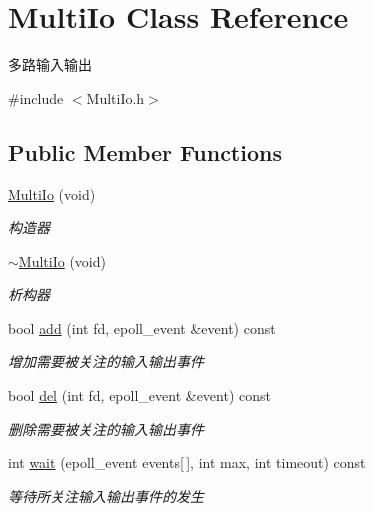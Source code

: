 \hypertarget{class_multi_io}{}\section{Multi\+Io Class Reference}
\label{class_multi_io}


多路输入输出  




{\ttfamily \#include $<$Multi\+Io.\+h$>$}

\subsection*{Public Member Functions}
\begin{DoxyCompactItemize}
\item 
\mbox{\label{class_multi_io_a36b33c460c20e55f060cd7a5d45cf987}} 
\hyperlink{class_multi_io_a36b33c460c20e55f060cd7a5d45cf987}{Multi\+Io} (void)
\begin{DoxyCompactList}\small\item\em 构造器 \end{DoxyCompactList}\item 
\mbox{\label{class_multi_io_adb76f15666679c952f2f5ac8a46fe457}} 
\hyperlink{class_multi_io_adb76f15666679c952f2f5ac8a46fe457}{$\sim$\+Multi\+Io} (void)
\begin{DoxyCompactList}\small\item\em 析构器 \end{DoxyCompactList}\item 
bool \hyperlink{class_multi_io_abfbf48636d495e4d8031b111aa39b292}{add} (int fd, epoll\+\_\+event \&event) const
\begin{DoxyCompactList}\small\item\em 增加需要被关注的输入输出事件 \end{DoxyCompactList}\item 
bool \hyperlink{class_multi_io_a2d87b0b65a615623a53477fbef0eeced}{del} (int fd, epoll\+\_\+event \&event) const
\begin{DoxyCompactList}\small\item\em 删除需要被关注的输入输出事件 \end{DoxyCompactList}\item 
int \hyperlink{class_multi_io_af42ad1d3a228e514b0c1536ab5f276d2}{wait} (epoll\+\_\+event events\mbox{[}$\,$\mbox{]}, int max, int timeout) const
\begin{DoxyCompactList}\small\item\em 等待所关注输入输出事件的发生 \end{DoxyCompactList}\end{DoxyCompactItemize}


